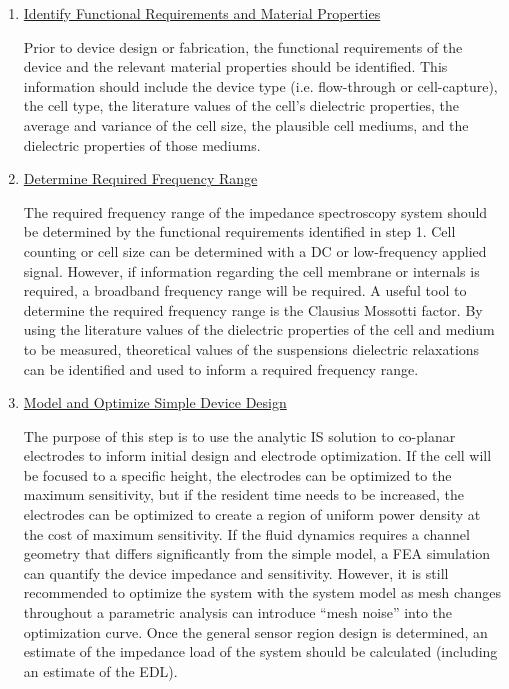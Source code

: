 \begin{enumerate}
    \item \underline{Identify Functional Requirements and Material Properties}
    \par Prior to device design or fabrication, the functional requirements of the device and the relevant material properties should be identified. This information should include the device type (i.e. flow-through or cell-capture), the cell type, the literature values of the cell's dielectric properties, the average and variance of the cell size, the plausible cell mediums, and the dielectric properties of those mediums.
    
    
    \item \underline{Determine Required Frequency Range}
    \par The required frequency range of the impedance spectroscopy system should be determined by the functional requirements identified in step 1. Cell counting or cell size can be determined with a DC or low-frequency applied signal. However, if information regarding the cell membrane or internals is required, a broadband frequency range will be required. A useful tool to determine the required frequency range is the Clausius Mossotti factor. By using the literature values of the dielectric properties of the cell and medium to be measured, theoretical values of the suspensions dielectric relaxations can be identified and used to inform a required frequency range.
    
    \item \underline{Model and Optimize Simple Device Design}
    \par The purpose of this step is to use the analytic IS solution to co-planar electrodes to inform initial design and electrode optimization. If the cell will be focused to a specific height, the electrodes can be optimized to the maximum sensitivity, but if the resident time needs to be increased, the electrodes can be optimized to create a region of uniform power density at the cost of maximum sensitivity. If the fluid dynamics requires a channel geometry that differs significantly from the simple model, a FEA simulation can quantify the device impedance and sensitivity.  However, it is still recommended to optimize the system with the system model as mesh changes throughout a parametric analysis can introduce “mesh noise” into the optimization curve. Once the general sensor region design is determined, an estimate of the impedance load of the system should be calculated (including an estimate of the EDL). 
    

\end{enumerate}
